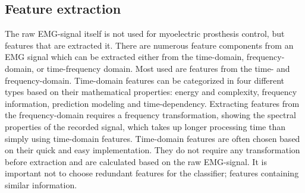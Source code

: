 \subsection{Feature extraction}

The raw EMG-signal itself is not used for myoelectric prosthesis control, but features that are extracted it. %
There are numerous feature components from an EMG signal which can be extracted either from the time-domain, frequency-domain, or time-frequency domain. Most used are features from the time- and frequency-domain. Time-domain features can be categorized in four different types based on their mathematical properties: energy and complexity, frequency information, prediction modeling and time-dependency. Extracting features from the frequency-domain requires a frequency transformation, showing the spectral properties of the recorded signal, which takes up longer processing time than simply using time-domain features. 
Time-domain features are often chosen based on their quick and easy implementation. They do not require any transformation before extraction and are calculated based on the raw EMG-signal. It is important not to choose redundant features for the classifier; features containing similar information. \cite{Phiny2012} 